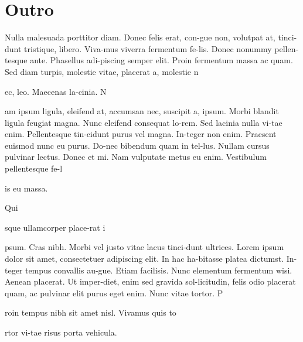 \documentclass[bleed=3mm,grid,graphpaper]{xput}
\begin{document}
{{      \section*{Outro}
      Nulla malesuada porttitor diam. Donec felis erat, con-gue non, volutpat at, tinci-dunt tristique, libero. Viva-mus viverra fermentum fe-lis. Donec nonummy pellen-tesque ante. Phasellus adi-piscing semper elit. Proin fermentum massa ac quam. Sed diam turpis, molestie vitae, placerat a, molestie n\strut ec, leo. Maecenas la-cinia. N\strut am ipsum ligula, eleifend at, accumsan nec, suscipit a, ipsum. Morbi blandit ligula feugiat magna. Nunc eleifend consequat lo-rem. Sed lacinia nulla vi-tae enim. Pellentesque tin-cidunt purus vel magna. In-teger non enim. Praesent euismod nunc eu purus. Do-nec bibendum quam in tel-lus. Nullam cursus pulvinar lectus. Donec et mi. Nam vulputate metus eu enim. Vestibulum pellentesque fe-l\strut is eu massa.
      \par
Qui\strut sque ullamcorper place-rat i\strut psum. Cras nibh. Morbi vel justo vitae lacus tinci-dunt ultrices. Lorem ipsum dolor sit amet, consectetuer adipiscing elit. In hac ha-bitasse platea dictumst. In-teger tempus convallis au-gue. Etiam facilisis. Nunc elementum fermentum wisi. Aenean placerat. Ut imper-diet, enim sed gravida sol-licitudin, felis odio placerat quam, ac pulvinar elit purus eget enim. Nunc vitae tortor. P\strut roin tempus nibh sit amet nisl. Vivamus quis to\strut rtor vi-tae risus porta vehicula.
    }
    \usetext[fix]
  }

\end{document}

